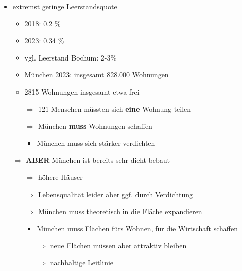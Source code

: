 \documentclass[12pt,a3paper]{report}
\begin{document}
\begin{itemize}
\begin{itemize}
\begin{itemize}
\begin{itemize}
				\end{itemize}
			\end{itemize}
			\item extremst geringe Leerstandsquote
			\begin{itemize}
				\item 2018: 0.2 \%
				\item 2023: 0.34 \%
				\item vgl. Leerstand Bochum: 2-3\%
				\item München 2023: insgesamt 828.000 Wohnungen
				\item 2815 Wohnungen insgesamt etwa frei
				\item[$\Rightarrow$] 121 Menschen müssten sich \textbf{eine} Wohnung teilen
				\item[$\Rightarrow$] München \textbf{muss} Wohnungen schaffen
				\begin{itemize}
					\item München muss sich stärker verdichten
				\end{itemize}
			\end{itemize} 
			\item[$\Rightarrow$] \textbf{ABER} München ist bereits sehr dicht bebaut
			\begin{itemize}
				\item[$\Rightarrow$] höhere Häuser
				\item[$\Rightarrow$] Lebensqualität leider aber ggf. durch Verdichtung
				\item[$\Rightarrow$] München muss theoretisch in die Fläche expandieren 
				\begin{itemize}
					\item München muss Flächen fürs Wohnen, für die Wirtschaft schaffen
					\item[$\Rightarrow$] neue Flächen müssen aber attraktiv bleiben
					\item[$\Rightarrow$] nachhaltige Leitlinie
				\end{itemize}
			\end{itemize}
		\end{itemize}
	\end{itemize}
\end{document}
